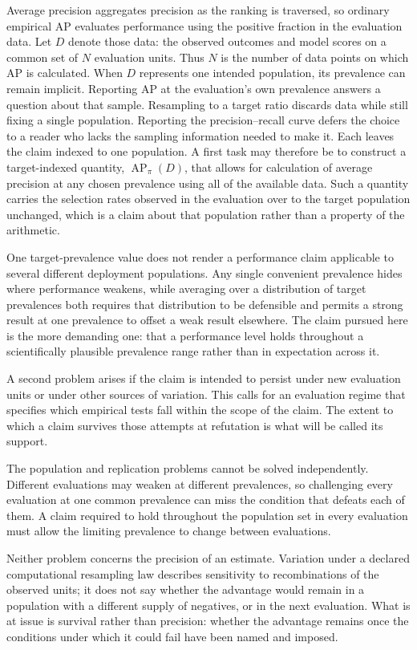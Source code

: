 \documentclass[11pt]{article}
\newcommand{\AP}{\operatorname{AP}}
\theoremstyle{remark}
\begin{document}
Average precision aggregates precision as the ranking is traversed, so ordinary
empirical AP evaluates performance using the positive fraction in the
evaluation data. Let $D$ denote those data: the observed outcomes and model
scores on a common set of $N$ evaluation units. Thus $N$ is the number of data
points on which AP is calculated. When $D$ represents one intended
population, its prevalence can remain implicit. Reporting AP at the
evaluation's own prevalence answers a question about that sample. Resampling to
a target ratio discards data while still fixing a single population. Reporting
the precision--recall curve defers the choice to a reader who lacks the
sampling information needed to make it. Each leaves the claim indexed to one
population. A first task may therefore be to construct a target-indexed
quantity, $\AP_\pi(D)$, that allows for calculation of average precision at any
chosen prevalence using all of the available data. Such a quantity carries the
selection rates observed in the evaluation over to the target population
unchanged, which is a claim about that population rather than a property of the
arithmetic.

One target-prevalence value does not render a performance claim applicable to
several different deployment populations. Any single convenient prevalence
hides where performance weakens, while averaging over a distribution of target
prevalences both requires that distribution to be defensible and permits a
strong result at one prevalence to offset a weak result elsewhere. The claim
pursued here is the more demanding one: that a performance level holds
throughout a scientifically plausible prevalence range rather than in
expectation across it.

A second problem arises if the claim is intended to persist under new
evaluation units or under other sources of variation. This calls for an
evaluation regime that specifies which empirical tests fall within the scope
of the claim. The extent to which a claim survives those attempts at
refutation is what will be called its support.

The population and replication problems cannot be solved independently.
Different evaluations may weaken at different prevalences, so challenging every
evaluation at one common prevalence can miss the condition that defeats each of
them. A claim required to hold throughout the population set in every
evaluation must allow the limiting prevalence to change between evaluations.

Neither problem concerns the precision of an estimate. Variation under a
declared computational resampling law describes sensitivity to recombinations
of the observed units; it does not say whether the advantage would remain in a
population with a different supply of negatives, or in the next evaluation.
What is at issue is survival rather than precision: whether the advantage
remains once the conditions under which it could fail have been named and
imposed.
\end{document}

